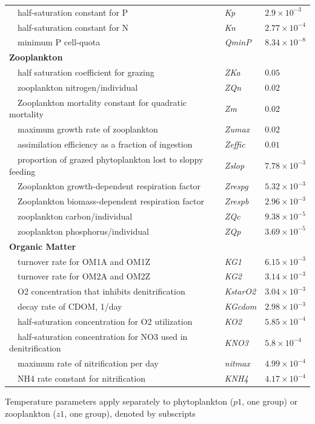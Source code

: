 \documentclass[letterpaper,12pt,oneside]{article}\usepackage[]{graphicx}\usepackage[]{color}
\begin{document}
\begin{table}[!tbp]
{\begin{center}
\begin{tabular}{lll}
~~half-saturation constant for P&\textit{Kp}&$2.9\times 10^{-3}$\tabularnewline
~~half-saturation constant for N&\textit{Kn}&$2.77\times 10^{-4}$\tabularnewline
~~minimum P cell-quota&\textit{QminP}&$8.34\times 10^{-8}$\tabularnewline
\hline
{\bfseries Zooplankton}&&\tabularnewline
~~half saturation coefficient for grazing&\textit{ZKa}&$0.05$\tabularnewline
~~zooplankton nitrogen/individual&\textit{ZQn}&$0.02$\tabularnewline
~~Zooplankton mortality constant for quadratic mortality&\textit{Zm}&$0.02$\tabularnewline
~~maximum growth rate of zooplankton&\textit{Zumax}&$0.02$\tabularnewline
~~assimilation efficiency as a fraction of ingestion&\textit{Zeffic}&$0.01$\tabularnewline
~~proportion of grazed phytoplankton lost to sloppy feeding&\textit{Zslop}&$7.78\times 10^{-3}$\tabularnewline
~~Zooplankton growth-dependent respiration factor&\textit{Zrespg}&$5.32\times 10^{-3}$\tabularnewline
~~Zooplankton biomass-dependent respiration factor&\textit{Zrespb}&$2.96\times 10^{-3}$\tabularnewline
~~zooplankton carbon/individual&\textit{ZQc}&$9.38\times 10^{-5}$\tabularnewline
~~zooplankton phosphorus/individual&\textit{ZQp}&$3.69\times 10^{-5}$\tabularnewline
\hline
{\bfseries Organic Matter}&&\tabularnewline
~~turnover rate for OM1A and OM1Z&\textit{KG1}&$6.15\times 10^{-3}$\tabularnewline
~~turnover rate for OM2A and OM2Z&\textit{KG2}&$3.14\times 10^{-3}$\tabularnewline
~~O2 concentration that inhibits denitrification&\textit{KstarO2}&$3.04\times 10^{-3}$\tabularnewline
~~decay rate of CDOM, 1/day&\textit{KGcdom}&$2.98\times 10^{-3}$\tabularnewline
~~half-saturation concentration for O2 utilization&\textit{KO2}&$5.85\times 10^{-4}$\tabularnewline
~~half-saturation concentration for NO3 used in denitrification&\textit{KNO3}&$5.8\times 10^{-4}$\tabularnewline
~~maximum rate of nitrification per day&\textit{nitmax}&$4.99\times 10^{-4}$\tabularnewline
~~NH4 rate constant for nitrification&\textit{KNH4}&$4.17\times 10^{-4}$\tabularnewline
\hline
\end{tabular}\end{center}}

\footnotesize *Temperature parameters apply separately to phytoplankton ($p1$, one group) or zooplankton ($z1$, one group), denoted by subscripts\end{table}
\end{document}
